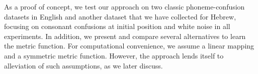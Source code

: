 As a proof of concept, we test our approach on two classic phoneme-confusion datasets in English \citep{NicelyMiller1955, Luce1987} and another dataset that we have collected for Hebrew, focusing on consonant confusions at initial position and white noise in all experiments. In addition, we present and compare several alternatives to learn the metric function. For computational convenience, we assume a linear mapping and a symmetric metric function. However, the approach lends itself to alleviation of such assumptions, as we later discuss.